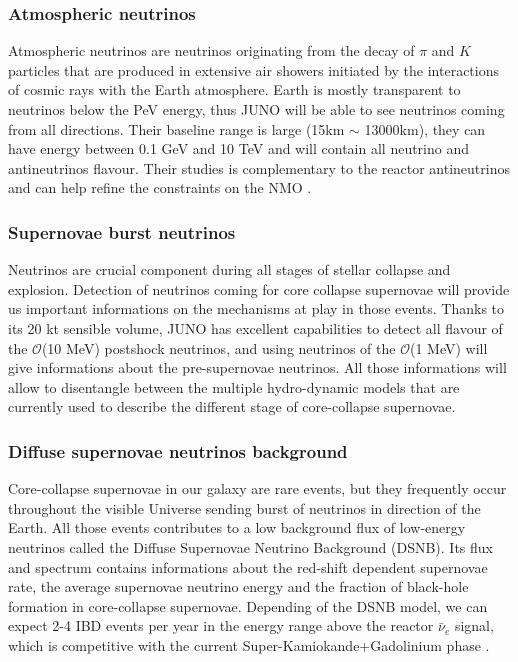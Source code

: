\documentclass[../main.tex]{subfiles}
\begin{document}
\subsubsection{Atmospheric neutrinos}

Atmospheric neutrinos are neutrinos originating from the decay of $\pi$ and $K$ particles that are produced in extensive air showers initiated by the interactions of cosmic rays with the Earth atmosphere. Earth is mostly transparent to neutrinos below the PeV energy, thus JUNO will be able to see neutrinos coming from all directions. Their baseline range is large (15km $\sim$ 13000km), they can have energy between 0.1 GeV and 10 TeV and will contain all neutrino and antineutrinos flavour. Their studies is complementary to the reactor antineutrinos and can help refine the constraints on the NMO \cite{an_neutrino_2016}.

\subsubsection{Supernovae burst neutrinos}

Neutrinos are crucial component during all stages of stellar collapse and explosion. Detection of neutrinos coming for core collapse supernovae will provide us important informations on the mechanisms at play in those events.
Thanks to its 20 kt sensible volume, JUNO has excellent capabilities to detect all flavour of the $\mathcal{O}$(10 MeV) postshock neutrinos, and using neutrinos of the $\mathcal{O}$(1 MeV) will give informations about the pre-supernovae neutrinos. All those informations will allow to disentangle between the multiple hydro-dynamic models that are currently used to describe the different stage of core-collapse supernovae.

\subsubsection{Diffuse supernovae neutrinos background}

Core-collapse supernovae in our galaxy are rare events, but they frequently occur throughout the visible Universe sending burst of neutrinos in direction of the Earth. All those events contributes to a low background flux of low-energy neutrinos called the Diffuse Supernovae Neutrino Background (DSNB). Its flux and spectrum contains informations about the red-shift dependent supernovae rate, the average supernovae neutrino energy and the fraction of black-hole formation in core-collapse supernovae. Depending of the DSNB model, we can expect 2-4 IBD events per year in the energy range above the reactor $\bar{\nu}_e$ signal, which is competitive with the current Super-Kamiokande+Gadolinium phase \cite{collaboration_diffuse_2021}.
\end{document}
